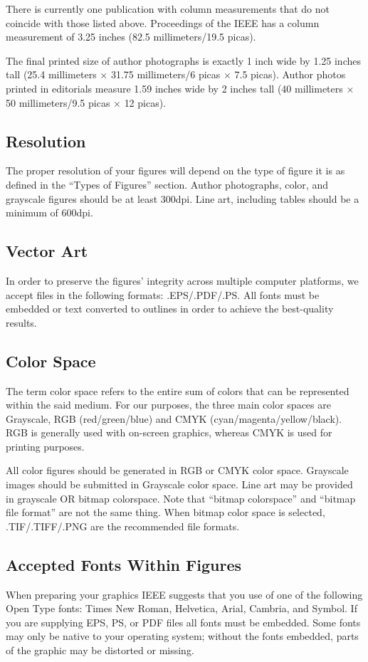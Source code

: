 \documentclass[twoside,web]{ieeecolor}
\begin{document}
There is currently one publication with column measurements that do not 
coincide with those listed above. Proceedings of the IEEE has a column 
measurement of 3.25 inches (82.5 millimeters/19.5 picas). 

The final printed size of author photographs is exactly
1 inch wide by 1.25 inches tall (25.4 millimeters$\,\times\,$31.75 millimeters/6 
picas$\,\times\,$7.5 picas). Author photos printed in editorials measure 1.59 inches 
wide by 2 inches tall (40 millimeters$\,\times\,$50 millimeters/9.5 picas$\,\times\,$12 
picas).

\subsection{Resolution }
The proper resolution of your figures will depend on the type of figure it 
is as defined in the ``Types of Figures'' section. Author photographs, 
color, and grayscale figures should be at least 300dpi. Line art, including 
tables should be a minimum of 600dpi.

\subsection{Vector Art}
In order to preserve the figures' integrity across multiple computer 
platforms, we accept files in the following formats: .EPS/.PDF/.PS. All 
fonts must be embedded or text converted to outlines in order to achieve the 
best-quality results.

\subsection{Color Space}
The term color space refers to the entire sum of colors that can be 
represented within the said medium. For our purposes, the three main color 
spaces are Grayscale, RGB (red/green/blue) and CMYK 
(cyan/magenta/yellow/black). RGB is generally used with on-screen graphics, 
whereas CMYK is used for printing purposes.

All color figures should be generated in RGB or CMYK color space. Grayscale 
images should be submitted in Grayscale color space. Line art may be 
provided in grayscale OR bitmap colorspace. Note that ``bitmap colorspace'' 
and ``bitmap file format'' are not the same thing. When bitmap color space 
is selected, .TIF/.TIFF/.PNG are the recommended file formats.

\subsection{Accepted Fonts Within Figures}
When preparing your graphics IEEE suggests that you use of one of the 
following Open Type fonts: Times New Roman, Helvetica, Arial, Cambria, and 
Symbol. If you are supplying EPS, PS, or PDF files all fonts must be 
embedded. Some fonts may only be native to your operating system; without 
the fonts embedded, parts of the graphic may be distorted or missing.
\end{document}
